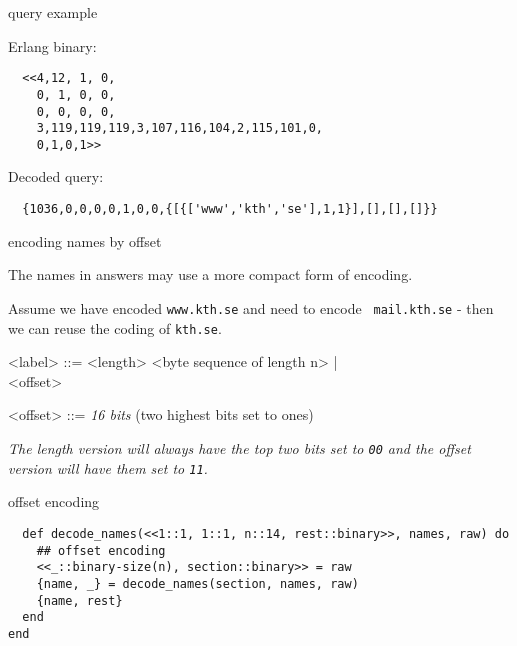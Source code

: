 \begin{frame}[fragile]{query example}

  Erlang binary:
\begin{verbatim}
  <<4,12, 1, 0,
    0, 1, 0, 0,
    0, 0, 0, 0,
    3,119,119,119,3,107,116,104,2,115,101,0,
    0,1,0,1>>
\end{verbatim}

\vspace{20pt} \pause
  Decoded query:
\begin{verbatim}
  {1036,0,0,0,0,1,0,0,{[{['www','kth','se'],1,1}],[],[],[]}}
\end{verbatim}  

\end{frame}

\begin{frame}{encoding names by offset}

The names in answers may use a more compact form of encoding.  

\vspace{20pt}\pause

Assume we have encoded {\tt www.kth.se} and need to encode {\tt
  mail.kth.se} - then we can reuse the coding of {\tt kth.se}.

\vspace{20pt} \pause

\begin{grammar}
<label> ::=  <length> <byte sequence of length n> | \\
             <offset>

<offset> ::= {\em 16 bits} (two highest bits set to ones)

\end{grammar}


\vspace{20pt} \pause


{\em The length version will always have the top two bits set to {\tt 00} and the offset version will have them set to {\tt 11}.}

\end{frame}

\begin{frame}[fragile]{offset encoding}


\begin{verbatim}
  def decode_names(<<1::1, 1::1, n::14, rest::binary>>, names, raw) do
    ## offset encoding
    <<_::binary-size(n), section::binary>> = raw
    {name, _} = decode_names(section, names, raw)
    {name, rest}
  end
end
\end{verbatim}

\end{frame}

